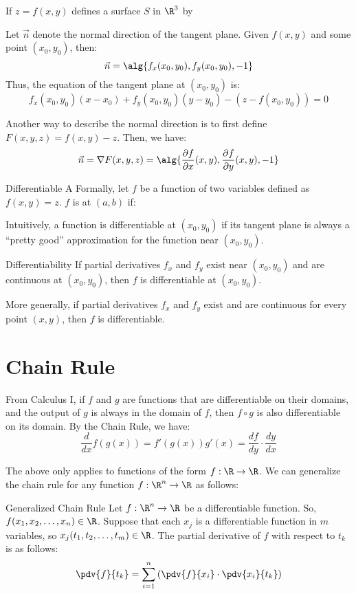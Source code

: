 If $z = f(x,y)$ defines a surface $S$ in $\R^3$ by 

Let $\vec{n}$ denote the normal direction of the tangent plane. Given $f(x,y)$ and some point $(x_0, y_0)$, then:
\[ \vec{n} = \alg{f_x(x_0, y_0), f_y(x_0, y_0), -1} \]
Thus, the equation of the tangent plane at $(x_0, y_0)$ is:
\[ f_x(x_0, y_0) (x - x_0) + f_y(x_0, y_0) (y - y_0) - (z - f(x_0, y_0)) = 0 \]

Another way to describe the normal direction is to first define $F(x,y,z) = f(x,y) - z$. Then, we have:
\[ \vec{n} = \nabla F(x,y,z) = \alg{ \frac{\partial f}{\partial x} (x,y) , \frac{\partial f}{\partial y} (x,y), -1 } \]

\begin{dfnbox}{Differentiable}{}
    A
    \tcblower
    Formally, let $f$ be a function of two variables defined as $f(x,y) = z$. $f$ is  at $(a,b)$ if:
\end{dfnbox}

Intuitively, a function is differentiable at $(x_0, y_0)$ if its tangent plane is always a ``pretty good'' approximation for the function near $(x_0, y_0)$.

\begin{thmbox}{Differentiability}{}
    If partial derivatives $f_x$ and $f_y$ exist near $(x_0, y_0)$ and are continuous at $(x_0, y_0)$, then $f$ is differentiable at $(x_0, y_0)$.
\end{thmbox}

More generally, if partial derivatives $f_x$ and $f_y$ exist and are continuous for every point $(x,y)$, then $f$ is differentiable.

\section{Chain Rule}

From Calculus I, if $f$ and $g$ are functions that are differentiable on their domains, and the output of $g$ is always in the domain of $f$, then $f \circ g$ is also differentiable on its domain. By the Chain Rule, we have:
\[ \frac{d}{dx} f(g(x)) = f \prime (g(x)) g\prime(x) = \frac{df}{dy} \cdot \frac{dy}{dx} \]

The above only applies to functions of the form $f : \R \to \R$. We can generalize the chain rule for any function $f : \R^n \to \R$ as follows:

\begin{thmbox}{Generalized Chain Rule}{}
    Let $f : \R^n \to \R$ be a differentiable function. So, $f(x_1, x_2, \ldots, x_n) \in \R$. Suppose that each $x_j$ is a differentiable function in $m$ variables, so $x_j(t_1, t_2, \ldots, t_m) \in \R$. The partial derivative of $f$ with respect to $t_k$ is as follows:
    \[ \pdv{f}{t_k} = \sum_{i = 1}^{n} \left( \pdv{f}{x_i} \cdot \pdv{x_i}{t_k} \right) \]
\end{thmbox}

